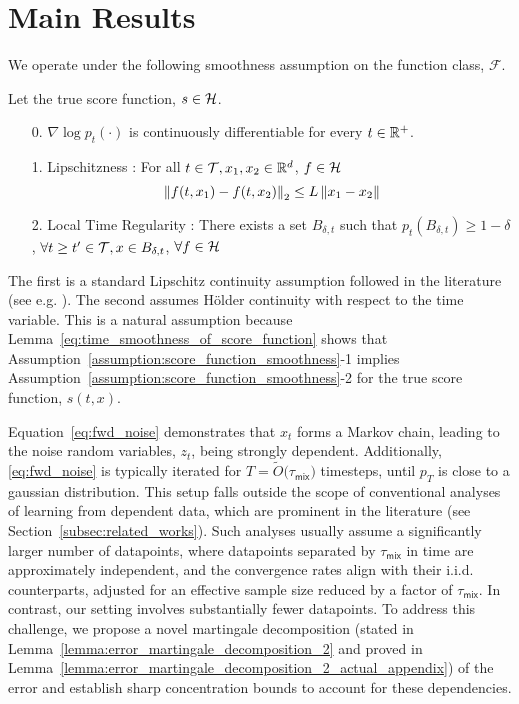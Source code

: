\section{Main Results}\label{sec:main_results}

We operate under the following smoothness assumption on the function class, $\mathcal{F}$. 

\begin{assumption}\label{assumption:score_function_smoothness}
Let the true score function, $s \in \mathcal{H}$. 
\begin{enumerate}
    \item[0.]$\nabla \log p_t(\cdot)$ is continuously differentiable for every $t \in \mathbb{R}^+$.
    \item[1.] Lipschitzness : For all $t \in \mathcal{T}, x_{1}, x_{2} \in \mathbb{R}^{d}$, $f \in \mathcal{H}$ $$\left\lVert f(t, x_{1}) - f(t, x_{2})\right\rVert_{2} \leq L\left\lVert x_{1}-x_{2}\right\rVert$$
    \item[2.] Local Time Regularity : There exists a set $B_{\delta,t}$ such that $p_t(B_{\delta,t}) \geq 1 -\delta$, $\forall t \geq t' \in \mathcal{T}, x \in B_{\delta,t}$, $\forall f \in \mathcal{H}$
\end{enumerate}
\end{assumption}

The first is a standard Lipschitz continuity assumption followed in the literature (see e.g. \cite{block2020generative}). The second assumes H\"older continuity with respect to the time variable. This is a natural assumption because Lemma~\ref{eq:time_smoothness_of_score_function} shows that Assumption~\ref{assumption:score_function_smoothness}-1 implies Assumption~\ref{assumption:score_function_smoothness}-2 for the true score function, $s(t, x)$. 


Equation~\eqref{eq:fwd_noise} demonstrates that $x_t$ forms a Markov chain, leading to the noise random variables, $z_t$, being strongly dependent. Additionally, \eqref{eq:fwd_noise} is typically iterated for $T = \tilde{O}\big(\tau_{\mathsf{mix}}\big)$ timesteps, until $p_T$ is close to a gaussian distribution. This setup falls outside the scope of conventional analyses of learning from dependent data, which are prominent in the literature (see Section~\ref{subsec:related_works}). Such analyses usually assume a significantly larger number of datapoints, where datapoints separated by $\tau_{\mathsf{mix}}$ in time are approximately independent, and the convergence rates align with their i.i.d. counterparts, adjusted for an effective sample size reduced by a factor of $\tau_{\mathsf{mix}}$. In contrast, our setting involves substantially fewer datapoints. To address this challenge, we propose a novel martingale decomposition (stated in Lemma~\ref{lemma:error_martingale_decomposition_2} and proved in Lemma~\ref{lemma:error_martingale_decomposition_2_actual_appendix}) of the error and establish sharp concentration bounds to account for these dependencies.


